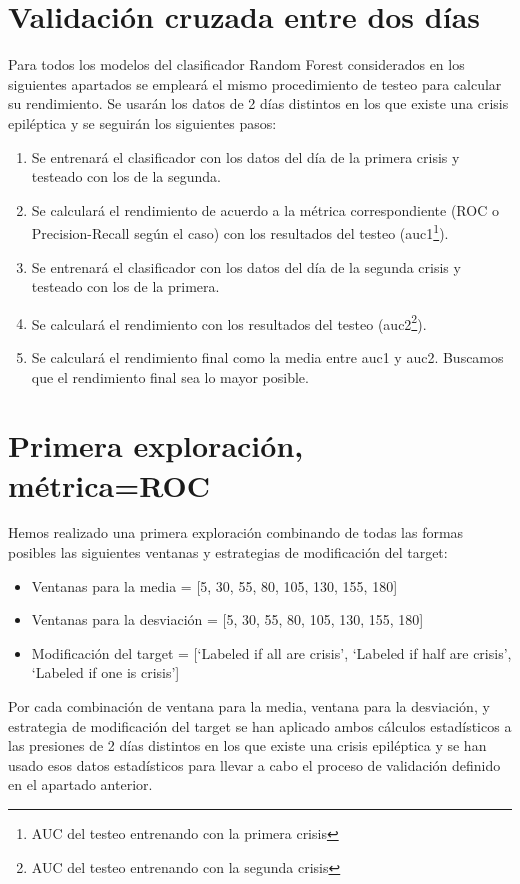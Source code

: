 \documentclass[a4paper,12pt,twoside,oldfontcommands]{memoir}
\begin{document}
	\section{Validación cruzada entre dos días}\label{rf1}
	
	Para todos los modelos del clasificador Random Forest considerados en los siguientes apartados se empleará el mismo procedimiento de testeo para calcular su rendimiento. Se usarán los datos de 2 días distintos en los que existe una crisis epiléptica y se seguirán los siguientes pasos: 
	
	\begin{enumerate}
		\item Se entrenará el clasificador con los datos del día de la primera crisis y testeado con los de la segunda. 
		\item Se calculará el rendimiento de acuerdo a la métrica correspondiente (ROC o Precision-Recall según el caso) con los resultados del testeo (auc1\footnote{AUC del testeo entrenando con la primera crisis}). 
		\item Se entrenará el clasificador con los datos del día de la segunda crisis y testeado con los de la primera. 
		\item Se calculará el rendimiento con los resultados del testeo (auc2\footnote{AUC del testeo entrenando con la segunda crisis}). 
		\item Se calculará el rendimiento final como la media entre auc1 y auc2. Buscamos que el rendimiento final sea lo mayor posible. 
	\end{enumerate}
	
	\section{Primera exploración, métrica=ROC}
	
	Hemos realizado una primera exploración combinando de todas las formas posibles las siguientes ventanas y estrategias de modificación del target: 
	\begin{itemize}
		\item Ventanas para la media = [5, 30, 55, 80, 105, 130, 155, 180]
		\item Ventanas para la desviación = [5, 30, 55, 80, 105, 130, 155, 180]
		\item Modificación del target = [`Labeled if all are crisis', `Labeled if half are crisis', `Labeled if one is crisis']
	\end{itemize}
	
	Por cada combinación de ventana para la media, ventana para la desviación, y estrategia de modificación del target se han aplicado ambos cálculos estadísticos a las presiones de 2 días distintos en los que existe una crisis epiléptica y se han usado esos datos estadísticos para llevar a cabo el proceso de validación definido en el apartado anterior.
	
\end{document}
